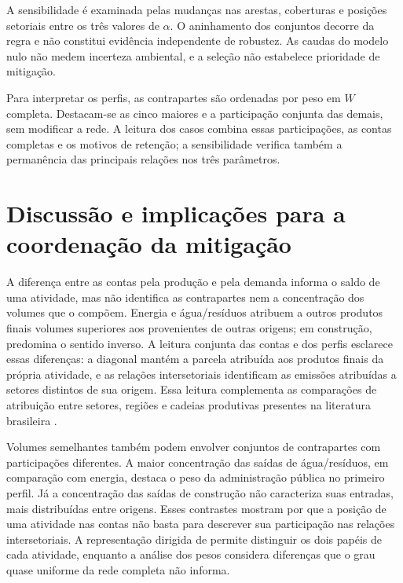 \documentclass[12pt]{article}
\begin{document}
A sensibilidade é examinada pelas mudanças nas arestas, coberturas e posições setoriais entre os três valores de $\alpha$. O aninhamento dos conjuntos decorre da regra e não constitui evidência independente de robustez. As caudas do modelo nulo não medem incerteza ambiental, e a seleção não estabelece prioridade de mitigação.

Para interpretar os perfis, as contrapartes são ordenadas por peso em $W$ completa. Destacam-se as cinco maiores e a participação conjunta das demais, sem modificar a rede. A leitura dos casos combina essas participações, as contas completas e os motivos de retenção; a sensibilidade verifica também a permanência das principais relações nos três parâmetros.

\clearpage

\clearpage
\section{Discussão e implicações para a coordenação da mitigação}

A diferença entre as contas pela produção e pela demanda informa o saldo de uma atividade, mas não identifica as contrapartes nem a concentração dos volumes que o compõem. Energia e água/resíduos atribuem a outros produtos finais volumes superiores aos provenientes de outras origens; em construção, predomina o sentido inverso. A leitura conjunta das contas e dos perfis esclarece essas diferenças: a diagonal mantém a parcela atribuída aos produtos finais da própria atividade, e as relações intersetoriais identificam as emissões atribuídas a setores distintos de sua origem. Essa leitura complementa as comparações de atribuição entre setores, regiões e cadeias produtivas presentes na literatura brasileira \parencite{imori2015,sanguinetAzzoni2024,montoyaEtAl2026}.

Volumes semelhantes também podem envolver conjuntos de contrapartes com participações diferentes. A maior concentração das saídas de água/resíduos, em comparação com energia, destaca o peso da administração pública no primeiro perfil. Já a concentração das saídas de construção não caracteriza suas entradas, mais distribuídas entre origens. Esses contrastes mostram por que a posição de uma atividade nas contas não basta para descrever sua participação nas relações intersetoriais. A representação dirigida de \textcite{huang2019} permite distinguir os dois papéis de cada atividade, enquanto a análise dos pesos considera diferenças que o grau quase uniforme da rede completa não informa.
\end{document}
